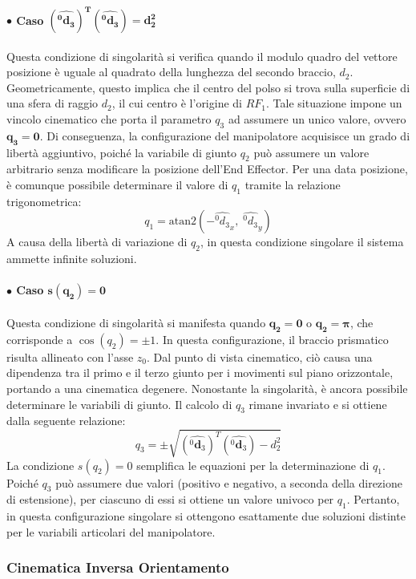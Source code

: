 \documentclass[11pt, a4paper]{report}
\begin{document}
\newpage
\paragraph{\(\bullet\) Caso \(\mathbf{(\hat{^{0}\mathbf{d}_{3}})^{T} (\hat{^{0}\mathbf{d}_{3}}) = d_{2}^{2}}\)}
Questa condizione di singolarità si verifica quando il modulo quadro del vettore posizione è uguale al quadrato della lunghezza del secondo braccio, \(d_2\). Geometricamente, questo implica che il centro del polso si trova sulla superficie di una sfera di raggio \(d_2\), il cui centro è l'origine di \(RF_{1}\). Tale situazione impone un vincolo cinematico che porta il parametro \(q_3\) ad assumere un unico valore, ovvero \(\mathbf{q_3 = 0}\). Di conseguenza, la configurazione del manipolatore acquisisce un grado di libertà aggiuntivo, poiché la variabile di giunto \(q_2\) può assumere un valore arbitrario senza modificare la posizione dell'End Effector. Per una data posizione, è comunque possibile determinare il valore di \(q_1\) tramite la relazione trigonometrica:
\[
    q_{1} = \text{atan2}(-\hat{^{0}d_{3}}_{x}, \;\hat{^{0}d_{3}}_{y})
\]
A causa della libertà di variazione di \(q_2\), in questa condizione singolare il sistema ammette infinite soluzioni.

\paragraph{\(\bullet\) Caso \(\mathbf{s(q_{2}) = 0}\)}
Questa condizione di singolarità si manifesta quando \(\mathbf{q_2 = 0}\) o \(\mathbf{q_2 = \pi}\), che corrisponde a \(\cos(q_{2}) = \pm 1\). In questa configurazione, il braccio prismatico risulta allineato con l'asse \(z_0\). Dal punto di vista cinematico, ciò causa una dipendenza tra il primo e il terzo giunto per i movimenti sul piano orizzontale, portando a una cinematica degenere. Nonostante la singolarità, è ancora possibile determinare le variabili di giunto. Il calcolo di \(q_3\) rimane invariato e si ottiene dalla seguente relazione:
\[
    q_{3} = \pm \sqrt{(\hat{^{0}\mathbf{d}_{3}})^{T} (\hat{^{0}\mathbf{d}_{3}}) - d_{2}^{2}}
\]
La condizione \(s(q_2)=0\) semplifica le equazioni per la determinazione di \(q_1\). Poiché \(q_3\) può assumere due valori (positivo e negativo, a seconda della direzione di estensione), per ciascuno di essi si ottiene un valore univoco per \(q_1\). Pertanto, in questa configurazione singolare si ottengono esattamente due soluzioni distinte per le variabili articolari del manipolatore.

\newpage
\subsubsection*{Cinematica Inversa Orientamento}
\end{document}
